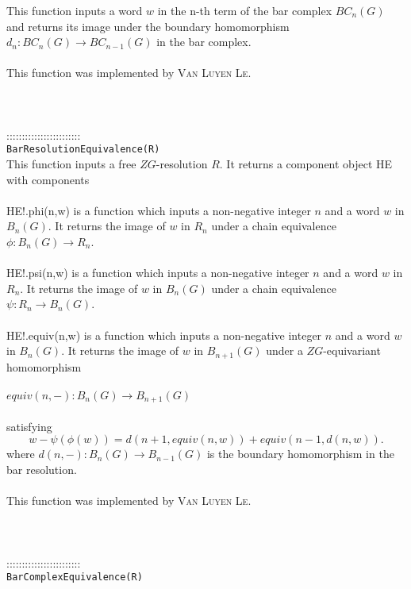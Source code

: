 \documentclass[a4paper,11pt]{report}
\begin{document}
{ This function inputs a word $w$ in the n-th term of the bar complex $BC_n(G)$ and returns its image under the boundary homomorphism $d_n\colon BC_n(G) \rightarrow BC_{n-1}(G)$ in the bar complex. \\
 \\
 This function was implemented by \textsc{Van Luyen Le}. \\
 \\
 \\
 \\
 ::::::::::::::::::::::::\\
 \texttt{BarResolutionEquivalence(R)}\\
 

 This function inputs a free $ZG$-resolution $R$. It returns a component object HE with components \\
 \\
 HE!.phi(n,w) is a function which inputs a non-negative integer $n$ and a word $w$ in $B_n(G)$. It returns the image of $w$ in $R_n$ under a chain equivalence $\phi\colon B_n(G) \rightarrow R_n$.\\
 \\
 HE!.psi(n,w) is a function which inputs a non-negative integer $n$ and a word $w$ in $R_n$. It returns the image of $w$ in $B_n(G)$ under a chain equivalence $\psi\colon R_n \rightarrow B_n(G)$.\\
 \\
 HE!.equiv(n,w) is a function which inputs a non-negative integer $n$ and a word $w$ in $B_n(G)$. It returns the image of $w$ in $B_{n+1}(G)$ under a $ZG$-equivariant homomorphism \\
 \\
 $equiv(n,-) \colon B_n(G) \rightarrow B_{n+1}(G)$ \\
 \\
 satisfying 
\[w - \psi ( \phi (w)) = d(n+1, equiv(n,w)) + equiv(n-1,d(n,w)) . \]
 where $d(n,-)\colon B_n(G) \rightarrow B_{n-1}(G)$ is the boundary homomorphism in the bar resolution. \\
 \\
 This function was implemented by \textsc{Van Luyen Le}. \\
 \\
 \\
 \\
 ::::::::::::::::::::::::\\
 \texttt{BarComplexEquivalence(R)}\\
 

}
\end{document}
